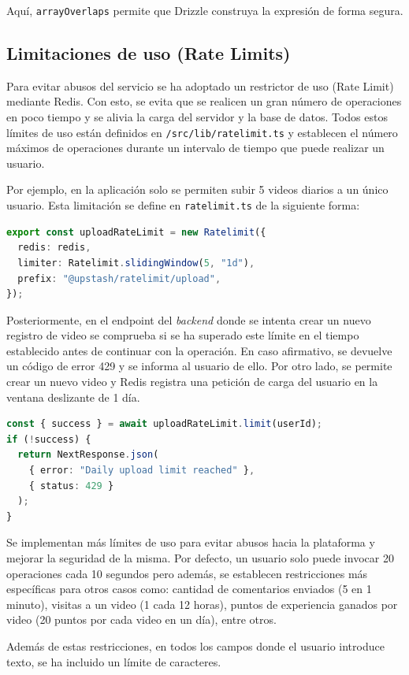 Aquí, \texttt{arrayOverlaps} permite que Drizzle construya la expresión de forma segura. 

\clearpage
\subsection{Limitaciones de uso (Rate Limits)}

Para evitar abusos del servicio se ha adoptado un restrictor de uso (Rate Limit) mediante Redis. Con esto, se evita que se realicen un gran número de operaciones en poco tiempo y se alivia la carga del servidor y la base de datos. Todos estos límites de uso están definidos en \texttt{/src/lib/ratelimit.ts} y establecen el número máximos de operaciones durante un intervalo de tiempo que puede realizar un usuario. 

Por ejemplo, en la aplicación solo se permiten subir 5 videos diarios a un único usuario. Esta limitación se define en \texttt{ratelimit.ts} de la siguiente forma:

\begin{lstlisting}[language=TypeScript]
export const uploadRateLimit = new Ratelimit({
  redis: redis,
  limiter: Ratelimit.slidingWindow(5, "1d"),
  prefix: "@upstash/ratelimit/upload",
});
\end{lstlisting}

Posteriormente, en el endpoint del \textit{backend} donde se intenta crear un nuevo registro de video se comprueba si se ha superado este límite en el tiempo establecido antes de continuar con la operación. En caso afirmativo, se devuelve un código de error 429 y se informa al usuario de ello. Por otro lado, se permite crear un nuevo video y Redis registra una petición de carga del usuario en la ventana deslizante de 1 día.
\begin{lstlisting}[language=TypeScript]
const { success } = await uploadRateLimit.limit(userId);
if (!success) {
  return NextResponse.json(
    { error: "Daily upload limit reached" },
    { status: 429 }
  );
}
\end{lstlisting}

Se implementan más límites de uso para evitar abusos hacia la plataforma y mejorar la seguridad de la misma. Por defecto, un usuario solo puede invocar 20 operaciones cada 10 segundos pero además, se establecen restricciones más específicas para otros casos como: cantidad de comentarios enviados (5 en 1 minuto), visitas a un video (1 cada 12 horas), puntos de experiencia ganados por video (20 puntos por cada video en un día), entre otros.

Además de estas restricciones, en todos los campos donde el usuario introduce texto, se ha incluido un límite de caracteres.  